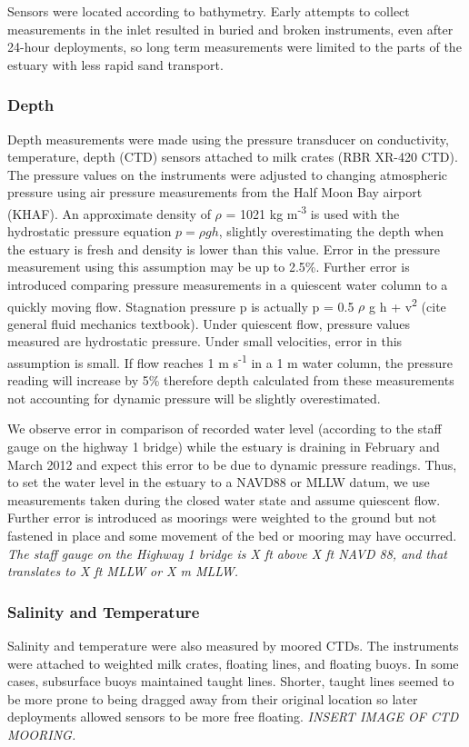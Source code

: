 Sensors were located according to bathymetry. Early attempts to collect measurements in the inlet resulted in buried and broken instruments, even after 24-hour deployments, so long term measurements were limited to the parts of the estuary with less rapid sand transport. 

\subsubsection{Depth} \label{sssec:depth}
Depth measurements were made using the pressure transducer on conductivity, temperature, depth (CTD) sensors
attached to milk crates (RBR XR-420 CTD). The pressure values on the instruments were adjusted to
changing atmospheric pressure using air pressure measurements from the
Half Moon Bay airport (KHAF). An approximate density of $\rho$ = 1021 kg
m\textsuperscript{-3} is used with the hydrostatic pressure equation ${p
= \rho g h}$, slightly overestimating the depth when the estuary is
fresh and density is lower than this value. Error in the pressure
measurement using this assumption may be up to 2.5\%. Further error is
introduced comparing pressure measurements in a quiescent water column
to a quickly moving flow. Stagnation pressure p is actually p = 0.5
$\rho$ g h +  v\textsuperscript{2} (cite general fluid mechanics
textbook). Under quiescent flow, pressure values measured are
hydrostatic pressure. Under small velocities, error in this assumption
is small. If flow reaches 1 m s\textsuperscript{-1} in a 1 m water
column, the pressure reading will increase by 5\% therefore depth
calculated from these measurements not accounting for dynamic pressure
will be slightly overestimated.

We observe error in comparison of recorded water level (according to the
staff gauge on the highway 1 bridge) while the estuary is draining in
February and March 2012 and expect this error to be due to dynamic
pressure readings. Thus, to set the water level in the estuary to a
NAVD88 or MLLW datum, we use measurements taken during the closed water
state and assume quiescent flow.  Further error is introduced as
moorings were weighted to the ground but not fastened in place and some
movement of the bed or mooring may have occurred. \emph{The staff gauge on the Highway 1 bridge is X ft above X ft NAVD 88, and that translates to X ft MLLW or X m MLLW.}

\subsubsection{Salinity and Temperature} \label{sssec:SandT}
Salinity and temperature were also measured by moored CTDs. The instruments were attached to weighted milk crates, floating lines, and floating buoys. In some cases, subsurface buoys maintained taught lines.  Shorter, taught lines seemed to be more prone to being dragged away from their original location so later deployments allowed sensors to be more free floating. \emph{INSERT IMAGE OF CTD MOORING.}

